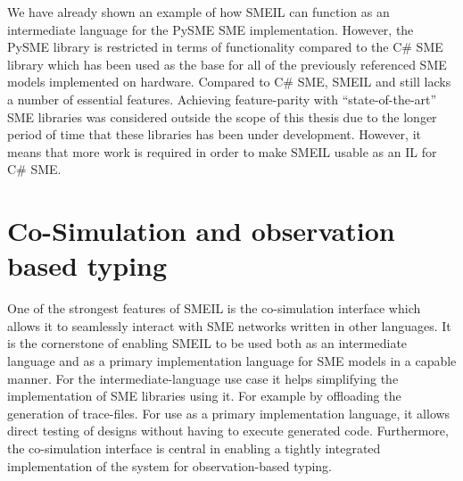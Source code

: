 We have already shown an example of how SMEIL can function as an intermediate
language for the PySME SME implementation. However, the PySME library is
restricted in terms of functionality compared to the C\# SME library which has
been used as the base for all of the previously referenced SME models
implemented on hardware. Compared to C\# SME, SMEIL and \libsme{} still lacks a
number of essential features. Achieving feature-parity with ``state-of-the-art''
SME libraries was considered outside the scope of this thesis due to the longer
period of time that these libraries has been under development. However, it
means that more work is required in order to make SMEIL usable as an IL for C\#
SME.




\section{Co-Simulation and observation based typing}
One of the strongest features of SMEIL is the co-simulation interface which
allows it to seamlessly interact with SME networks written in other
languages. It is the cornerstone of enabling SMEIL to be used both as an
intermediate language and as a primary implementation language for SME models in
a capable manner. For the intermediate-language use case it helps simplifying
the implementation of SME libraries using it. For example by offloading the
generation of trace-files. For use as a primary implementation language, it
allows direct testing of designs without having to execute generated
code. Furthermore, the co-simulation interface is central in enabling a tightly
integrated implementation of the system for observation-based typing.

